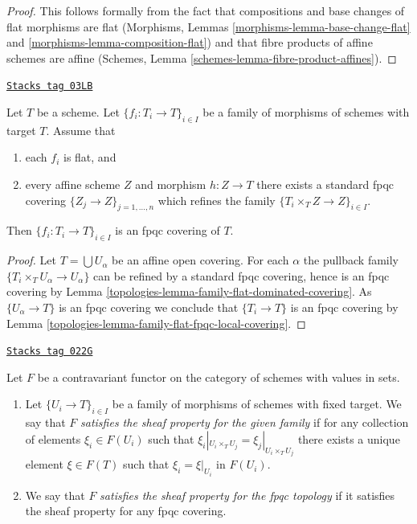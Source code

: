 \begin{proof}
This follows formally from the fact that compositions and base changes
of flat morphisms are flat
(Morphisms, Lemmas \ref{morphisms-lemma-base-change-flat} and
\ref{morphisms-lemma-composition-flat})
and that fibre products of affine schemes are affine
(Schemes, Lemma \ref{schemes-lemma-fibre-product-affines}).
\end{proof}

\begin{lemma}
\label{topologies-lemma-fpqc-covering-affines-mapping-in}
\href{https://stacks.math.columbia.edu/tag/03LB}{\texttt{Stacks tag 03LB}}

Let $T$ be a scheme. Let $\{f_i : T_i \to T\}_{i \in I}$ be a family of
morphisms of schemes with target $T$. Assume that
\begin{enumerate}
\item each $f_i$ is flat, and
\item every affine scheme
$Z$ and morphism $h : Z \to T$ there exists a standard fpqc covering
$\{Z_j \to Z\}_{j = 1, \ldots, n}$ which refines the family
$\{T_i \times_T Z \to Z\}_{i \in I}$.
\end{enumerate}
Then $\{f_i : T_i \to T\}_{i \in I}$ is an fpqc covering of $T$.
\end{lemma}

\begin{proof}

Let $T = \bigcup U_\alpha$ be an affine open covering.
For each $\alpha$ the pullback family $\{T_i \times_T U_\alpha \to U_\alpha\}$
can be refined by a standard fpqc covering, hence is an
fpqc covering by Lemma
\ref{topologies-lemma-family-flat-dominated-covering}.
As $\{U_\alpha \to T\}$ is an fpqc covering we conclude that
$\{T_i \to T\}$ is an fpqc covering by
Lemma \ref{topologies-lemma-family-flat-fpqc-local-covering}.
\end{proof}

\begin{definition}
\label{topologies-definition-sheaf-property-fpqc}
\href{https://stacks.math.columbia.edu/tag/022G}{\texttt{Stacks tag 022G}}

Let $F$ be a contravariant functor on the category
of schemes with values in sets.
\begin{enumerate}
\item Let $\{U_i \to T\}_{i \in I}$ be a family of morphisms
of schemes with fixed target.
We say that $F$ {\it satisfies the sheaf property for the given family}
if for any collection of elements $\xi_i \in F(U_i)$ such that
$\xi_i|_{U_i \times_T U_j} = \xi_j|_{U_i \times_T U_j}$
there exists a unique element
$\xi \in F(T)$ such that $\xi_i = \xi|_{U_i}$ in $F(U_i)$.
\item We say that $F$ {\it satisfies the sheaf property for the
fpqc topology} if it satisfies the sheaf property for any
fpqc covering.
\end{enumerate}
\end{definition}

